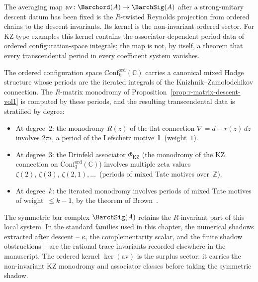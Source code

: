 \begin{remark}
\label{rem:motivic-interpretation}
The averaging map
$\mathrm{av}\colon\Barchord(A)\to\BarchSig(A)$
after a strong-unitary descent datum has been fixed
is the $R$-twisted Reynolds projection from ordered chains to the
descent invariants. Its kernel is the non-invariant ordered sector.
For KZ-type examples this kernel contains the associator-dependent
period data of ordered configuration-space integrals; the map is not,
by itself, a theorem that every transcendental period in every
coefficient system vanishes.

The ordered configuration space
$\mathrm{Conf}_k^{\mathrm{ord}}(\mathbb{C})$
carries a canonical mixed Hodge structure whose periods are
the iterated integrals of the Knizhnik--Zamolodchikov connection.
The $R$-matrix monodromy of
Proposition~\ref{prop:r-matrix-descent-vol1} is computed by these
periods, and the resulting transcendental data is stratified by
degree:
\begin{itemize}
\item At degree~$2$: the monodromy $R(z)$ of the flat connection
$\nabla = d - r(z)\,dz$ involves $2\pi i$, a period of
the Lefschetz motive~$\mathbb{L}$ (weight~$1$).

\item At degree~$3$: the Drinfeld associator
$\Phi_{\mathrm{KZ}}$
(the monodromy of the KZ connection on
$\mathrm{Conf}_3^{\mathrm{ord}}(\mathbb{C})$)
involves multiple zeta values
$\zeta(2),\,\zeta(3),\,\zeta(2,1),\ldots$\
(periods of mixed Tate motives over~$\mathbb{Z}$).

\item At degree~$k$: the iterated monodromy involves
periods of mixed Tate motives of weight~$\leq k-1$,
by the theorem of Brown~\cite{brown-mzv}.
\end{itemize}

\noindent
The symmetric bar complex $\BarchSig(A)$ retains the
$R$-invariant part of this local system. In the standard families
used in this chapter, the numerical shadows extracted after descent
-- $\kappa$, the complementarity scalar, and the finite shadow
obstructions -- are the rational trace invariants recorded elsewhere
in the manuscript. The ordered kernel
$\ker(\mathrm{av})$ is the surplus sector: it carries the
non-invariant KZ monodromy and associator classes before taking the
symmetric shadow.


\end{remark}
